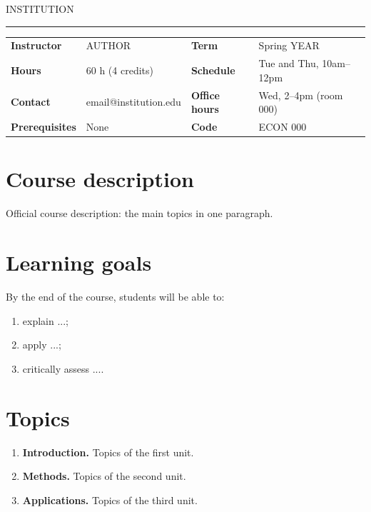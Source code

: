 \documentclass[11pt,a4paper]{article}
\newcommand{\disciplina}{{{TITLE}}}
\newcommand{\docente}{{{AUTHOR}}}
\begin{document}
{\color{tocaGrey}\small {{INSTITUTION}}}\par
{\LARGE\bfseries\color{tocaInk}\disciplina}\par
\vspace{0.3em}
{\color{tocaHoney}\rule{2.5cm}{3pt}}

\vspace{0.8em}
\begin{tabularx}{\linewidth}{@{}>{\bfseries}l X >{\bfseries}l X@{}}
  Instructor & \docente & Term & Spring {{YEAR}} \\
  Hours & 60 h (4 credits) & Schedule & Tue and Thu, 10am--12pm \\
  Contact & email@institution.edu & Office hours & Wed, 2--4pm (room 000) \\
  Prerequisites & None & Code & ECON 000 \\
\end{tabularx}

\section{Course description}
Official course description: the main topics in one paragraph.

\section{Learning goals}
By the end of the course, students will be able to:
\begin{enumerate}
  \item explain ...;
  \item apply ...;
  \item critically assess ....
\end{enumerate}

\section{Topics}
\begin{enumerate}[label=\textbf{Unit \arabic*.},leftmargin=*,align=left]
  \item \textbf{Introduction.} Topics of the first unit.
  \item \textbf{Methods.} Topics of the second unit.
  \item \textbf{Applications.} Topics of the third unit.
\end{enumerate}
\end{document}
